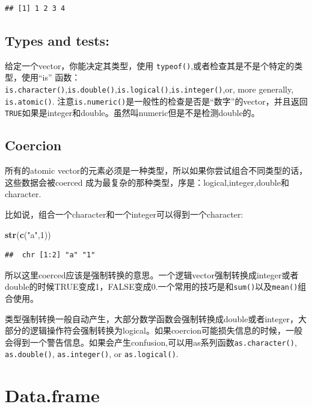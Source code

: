 \documentclass[
]{book}
\newenvironment{Shaded}{\begin{snugshade}}{\end{snugshade}}
\newcommand{\DecValTok}[1]{\textcolor[rgb]{0.00,0.00,0.81}{#1}}
\newcommand{\KeywordTok}[1]{\textcolor[rgb]{0.13,0.29,0.53}{\textbf{#1}}}
\newcommand{\NormalTok}[1]{#1}
\newcommand{\StringTok}[1]{\textcolor[rgb]{0.31,0.60,0.02}{#1}}
\theoremstyle{definition}
\theoremstyle{definition}
\theoremstyle{definition}
\theoremstyle{remark}
\begin{document}
\begin{verbatim}
## [1] 1 2 3 4
\end{verbatim}

\hypertarget{types-and-tests}{%
\subsection{Types and tests:}\label{types-and-tests}}

给定一个vector，你能决定其类型，使用 \texttt{typeof()},或者检查其是不是个特定的类型，使用``is'' 函数：\texttt{is.character()},\texttt{is.double()},\texttt{is.logical()},\texttt{is.integer()},or, more generally, \texttt{is.atomic()}.
注意\texttt{is.numeric()}是一般性的检查是否是``数字''的vector，并且返回\texttt{TRUE}如果是integer和double。虽然叫numeric但是不是检测double的。

\hypertarget{coercion}{%
\subsection{Coercion}\label{coercion}}

所有的atomic vector的元素必须是一种类型，所以如果你尝试组合不同类型的话，这些数据会被coerced 成为最复杂的那种类型，序是：logical,integer,double和character.

比如说，组合一个character和一个integer可以得到一个character:

\begin{Shaded}
\begin{Highlighting}[]
\KeywordTok{str}\NormalTok{(}\KeywordTok{c}\NormalTok{(}\StringTok{"a"}\NormalTok{,}\DecValTok{1}\NormalTok{))}
\end{Highlighting}
\end{Shaded}

\begin{verbatim}
##  chr [1:2] "a" "1"
\end{verbatim}

所以这里coerced应该是强制转换的意思。一个逻辑vector强制转换成integer或者double的时候TRUE变成1，FALSE变成0.一个常用的技巧是和\texttt{sum()}以及\texttt{mean()}组合使用。

类型强制转换一般自动产生，大部分数学函数会强制转换成double或者integer，大部分的逻辑操作符会强制转换为logical。如果coercion可能损失信息的时候，一般会得到一个警告信息。如果会产生confusion,可以用as系列函数\texttt{as.character()}, \texttt{as.double()}, \texttt{as.integer()}, or \texttt{as.logical()}.

\hypertarget{data.frame}{%
\section{Data.frame}\label{data.frame}}
\end{document}
